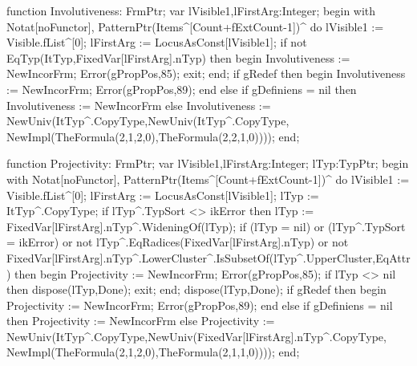    function Involutiveness: FrmPtr;
   var lVisible1,lFirstArg:Integer;
   begin
      with Notat[noFunctor], PatternPtr(Items^[Count+fExtCount-1])^ do
                                lVisible1 := Visible.fList^[0];
      lFirstArg := LocusAsConst[lVisible1];
      if not EqTyp(ItTyp,FixedVar[lFirstArg].nTyp) then
      begin
         Involutiveness := NewIncorFrm;
         Error(gPropPos,85);
         exit;
      end;
      if gRedef then
      begin
         Involutiveness := NewIncorFrm;
         Error(gPropPos,89);
      end
      else
         if gDefiniens = nil then Involutiveness := NewIncorFrm
         else
            Involutiveness := NewUniv(ItTyp^.CopyType,NewUniv(ItTyp^.CopyType,
                                                              NewImpl(TheFormula(2,1,2,0),TheFormula(2,2,1,0))));
   end;
   
   function Projectivity: FrmPtr;
   var lVisible1,lFirstArg:Integer;
   lTyp:TypPtr;
   begin
      with Notat[noFunctor], PatternPtr(Items^[Count+fExtCount-1])^ do
                                lVisible1 := Visible.fList^[0];
      lFirstArg := LocusAsConst[lVisible1];
      lTyp := ItTyp^.CopyType;
      if lTyp^.TypSort <> ikError then
         lTyp := FixedVar[lFirstArg].nTyp^.WideningOf(lTyp);
      if (lTyp = nil) or (lTyp^.TypSort = ikError) or
            not lTyp^.EqRadices(FixedVar[lFirstArg].nTyp) or
            not FixedVar[lFirstArg].nTyp^.LowerCluster^.IsSubsetOf(lTyp^.UpperCluster,EqAttr)
      then
      begin
         Projectivity := NewIncorFrm;
         Error(gPropPos,85);
         if lTyp <> nil then dispose(lTyp,Done);
         exit;
      end;
      dispose(lTyp,Done);
      if gRedef then
      begin
         Projectivity := NewIncorFrm;
         Error(gPropPos,89);
      end
      else
         if gDefiniens = nil then Projectivity := NewIncorFrm
         else
            Projectivity := NewUniv(ItTyp^.CopyType,NewUniv(FixedVar[lFirstArg].nTyp^.CopyType,
                                                            NewImpl(TheFormula(2,1,2,0),TheFormula(2,1,1,0))));
   end;
   
